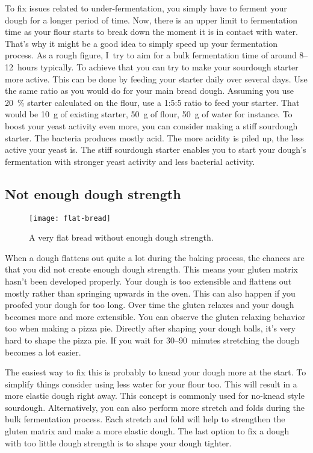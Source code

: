 To fix issues related to under-fermentation, you simply have to ferment your dough
for a longer period of time. Now, there is an upper limit to fermentation time
as your flour starts to break down the moment it is in contact with water. That's why it
might be a good idea to simply speed up your fermentation process. As a rough
figure, I~try to aim for a bulk fermentation time of around 8--12~hours typically.
To achieve that you can try to make your sourdough starter more active.  This can be done
by feeding your starter daily over several days. Use the same ratio as you would
do for your main bread dough. Assuming you use \qty{20}{\percent} starter
calculated on the flour, use a 1:5:5 ratio to feed your starter. That would be
\qty{10}{\gram} of existing starter, \qty{50}{\gram} of flour, \qty{50}{\gram}
of water for instance.  To boost your yeast activity even more, you can
consider making a stiff sourdough 
starter. The bacteria produces mostly acid. The more acidity
is piled up, the less active your yeast is. The stiff sourdough starter
enables you to start your dough's fermentation with stronger yeast activity
and less bacterial activity.

\subsection{Not enough dough strength}

\begin{figure}
  \texttt{[image: flat-bread]}
  \caption{A very flat bread without enough dough strength.}%
  \label{flat-bread}
\end{figure}

When a dough flattens out quite a lot during the baking process, the chances are
that you did not create enough dough strength. This means your gluten matrix
hasn't been developed properly. Your dough is too extensible and flattens out
mostly rather than springing upwards in the oven. This can also happen if you
proofed your dough for too long. Over time the gluten relaxes and your dough
becomes more and more extensible. You can observe the gluten relaxing behavior
too when making a pizza pie. Directly after shaping your dough balls, it's
very hard to shape the pizza pie. If you wait for 30--90~minutes stretching
the dough becomes a lot easier.

The easiest way to fix this is probably to knead your dough more at the start. To simplify
things consider using less water for your flour too. This will result in a more elastic dough
right away. This concept is commonly used for no-knead style sourdough.  Alternatively, you
can also perform more stretch and folds during the bulk fermentation process. Each
stretch and fold will help to strengthen the gluten matrix and make a more elastic dough.
The last option to fix a dough with too little dough strength is to shape your dough tighter.


